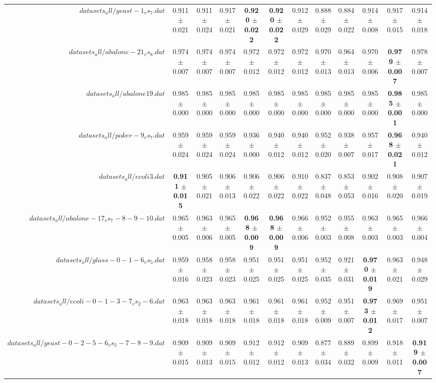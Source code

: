 \begin{table}[!ht]
{\begin{tabular}{r c c c c c c c c c c c}
$datasets_all/yeast-1_vs_7.dat$ & 0.911 $\pm$ 0.021 & 0.911 $\pm$ 0.024 & 0.917 $\pm$ 0.021 & \textbf{0.920 $\pm$ 0.022} & \textbf{0.920 $\pm$ 0.022} & 0.912 $\pm$ 0.029 & 0.888 $\pm$ 0.029 & 0.884 $\pm$ 0.022 & 0.914 $\pm$ 0.008 & 0.917 $\pm$ 0.015 & 0.914 $\pm$ 0.018 \\
$datasets_all/abalone-21_vs_8.dat$ & 0.974 $\pm$ 0.007 & 0.974 $\pm$ 0.007 & 0.974 $\pm$ 0.007 & 0.972 $\pm$ 0.012 & 0.972 $\pm$ 0.012 & 0.972 $\pm$ 0.012 & 0.970 $\pm$ 0.013 & 0.964 $\pm$ 0.013 & 0.970 $\pm$ 0.006 & \textbf{0.979 $\pm$ 0.007} & 0.978 $\pm$ 0.007 \\
$datasets_all/abalone19.dat$ & 0.985 $\pm$ 0.000 & 0.985 $\pm$ 0.000 & 0.985 $\pm$ 0.000 & 0.985 $\pm$ 0.000 & 0.985 $\pm$ 0.000 & 0.985 $\pm$ 0.000 & 0.985 $\pm$ 0.000 & 0.985 $\pm$ 0.000 & 0.985 $\pm$ 0.000 & \textbf{0.985 $\pm$ 0.001} & 0.985 $\pm$ 0.000 \\
$datasets_all/poker-9_vs_7.dat$ & 0.959 $\pm$ 0.024 & 0.959 $\pm$ 0.024 & 0.959 $\pm$ 0.024 & 0.936 $\pm$ 0.000 & 0.940 $\pm$ 0.012 & 0.940 $\pm$ 0.012 & 0.952 $\pm$ 0.020 & 0.938 $\pm$ 0.007 & 0.957 $\pm$ 0.017 & \textbf{0.968 $\pm$ 0.021} & 0.940 $\pm$ 0.012 \\
$datasets_all/ecoli3.dat$ & \textbf{0.911 $\pm$ 0.015} & 0.905 $\pm$ 0.021 & 0.906 $\pm$ 0.013 & 0.906 $\pm$ 0.022 & 0.906 $\pm$ 0.022 & 0.910 $\pm$ 0.022 & 0.837 $\pm$ 0.048 & 0.853 $\pm$ 0.053 & 0.902 $\pm$ 0.016 & 0.908 $\pm$ 0.020 & 0.907 $\pm$ 0.019 \\
$datasets_all/abalone-17_vs_7-8-9-10.dat$ & 0.965 $\pm$ 0.005 & 0.963 $\pm$ 0.006 & 0.965 $\pm$ 0.005 & \textbf{0.968 $\pm$ 0.009} & \textbf{0.968 $\pm$ 0.009} & 0.966 $\pm$ 0.006 & 0.952 $\pm$ 0.003 & 0.955 $\pm$ 0.008 & 0.963 $\pm$ 0.003 & 0.965 $\pm$ 0.003 & 0.966 $\pm$ 0.004 \\
$datasets_all/glass-0-1-6_vs_5.dat$ & 0.959 $\pm$ 0.016 & 0.958 $\pm$ 0.023 & 0.958 $\pm$ 0.023 & 0.951 $\pm$ 0.025 & 0.951 $\pm$ 0.025 & 0.951 $\pm$ 0.025 & 0.952 $\pm$ 0.035 & 0.921 $\pm$ 0.031 & \textbf{0.970 $\pm$ 0.019} & 0.963 $\pm$ 0.021 & 0.948 $\pm$ 0.029 \\
$datasets_all/ecoli-0-1-3-7_vs_2-6.dat$ & 0.963 $\pm$ 0.018 & 0.963 $\pm$ 0.018 & 0.963 $\pm$ 0.018 & 0.961 $\pm$ 0.018 & 0.961 $\pm$ 0.018 & 0.961 $\pm$ 0.018 & 0.952 $\pm$ 0.009 & 0.951 $\pm$ 0.007 & \textbf{0.973 $\pm$ 0.012} & 0.969 $\pm$ 0.017 & 0.951 $\pm$ 0.007 \\
$datasets_all/yeast-0-2-5-6_vs_3-7-8-9.dat$ & 0.909 $\pm$ 0.015 & 0.909 $\pm$ 0.013 & 0.909 $\pm$ 0.015 & 0.912 $\pm$ 0.012 & 0.912 $\pm$ 0.012 & 0.909 $\pm$ 0.013 & 0.877 $\pm$ 0.034 & 0.889 $\pm$ 0.032 & 0.899 $\pm$ 0.009 & 0.918 $\pm$ 0.011 & \textbf{0.919 $\pm$ 0.007} \\

\end{tabular}}
\end{table}
